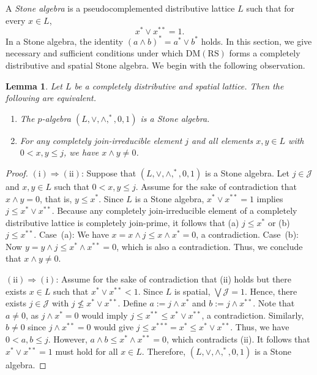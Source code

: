\documentclass[11pt,a4paper]{amsart}
\theoremstyle{plain}
\newtheorem{lemma}[theorem]{Lemma}
\theoremstyle{definition}
\theoremstyle{remark}
\numberwithin{equation}{section}
\begin{document}
A \emph{Stone algebra} is a pseudocomplemented distributive lattice $L$ such that for every $x \in L$,
\begin{equation}\label{eq:Stone_equation}
 x^* \vee x^{**} = 1.
\end{equation}
In a Stone algebra, the identity $(a\wedge b)^* = a^* \vee b^*$  holds.
In this section, we give necessary and sufficient conditions under which $\mathrm{DM(RS)}$ 
forms a completely distributive and spatial Stone algebra. 
We begin with the following observation.

\begin{lemma} \label{lem:Stone}
Let $L$ be a completely distributive and spatial
lattice. Then the following are equivalent.
\begin{enumerate}[label={\rm (\roman*)}]
\item The $p$-algebra $(L,\vee,\wedge,^*,0,1)$ is a Stone algebra.
\item For any completely join-irreducible element $j$ and all
elements $x,y \in L$ with $0 < x,y \leq j$, we have $x \wedge y \neq 0$.
\end{enumerate}
\end{lemma}

\begin{proof}
$\mathrm{(i)}\Rightarrow\mathrm{(ii)}$:  
Suppose that $(L,\vee,\wedge,^*,0,1)$ is a Stone algebra.
Let $j \in \mathcal{J}$ and $x,y\in L$ such that $0<x,y\leq j$.
Assume for the sake of contradiction that $x \wedge y = 0$, that is, 
$y\leq x^*$. Since $L$ is a Stone algebra,
$x^*\vee x^{**}=1$ implies $j\leq x^*\vee x^{**}$.
Because any completely join-irreducible element of a completely distributive lattice is completely join-prime, it follows that
(a) $j \leq x^*$ or (b) $j\leq x^{**}$. Case~{(a)}: We have  
$x = x \wedge j \leq x \wedge x^* = 0$, a contradiction. 
Case~{(b)}: Now $y = y \wedge j \leq x^* \wedge x^{**}=0$, which is also a contradiction. Thus, we conclude that $x \wedge y\neq 0$.

$\mathrm{(ii)}\Rightarrow\mathrm{(i)}$:  
Assume for the sake of contradiction that (ii) holds but there exists 
$x\in L$ such that  $x^*\vee x^{**}<1$. Since $L$ is spatial,
$\bigvee \mathcal{J} = 1$. Hence, there exists  
$j \in \mathcal{J}$ with $j \nleq x^*\vee x^{**}$. 
Define $a := j \wedge x^*$ and $b := j\wedge x^{**}$. 
Note that $a \neq 0$, as $j \wedge x^* = 0$ would imply 
$j \leq x^{**}\leq x^*\vee x^{**}$, a contradiction.
Similarly, $b \neq 0$ since $j\wedge x^{**} = 0$ would
give $j \leq x^{***} = x^* \leq x^*\vee x^{**}$.
Thus, we have $0 < a,b \leq j$. However, 
$a \wedge b \leq x^*\wedge x^{**}=0$, which contradicts (ii). 
It follows that $x^* \vee x^{**}=1$ must hold for all $x\in L$. 
Therefore, $(L,\vee,\wedge,^*,0,1)$ is a Stone algebra.
\end{proof}
\end{document}
